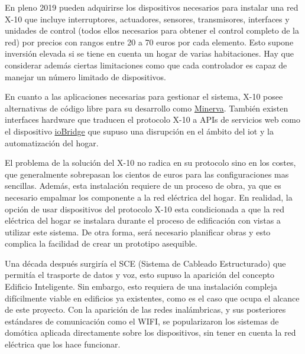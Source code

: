 \vspace{1.5cm}

En pleno 2019 pueden adquirirse los dispositivos necesarios para instalar una red X-10 que incluye interruptores, actuadores, sensores, transmisores, interfaces y unidades de control (todos ellos necesarios para obtener el control completo de la red) por precios con rangos entre 20 a 70 euros por cada elemento. Esto supone inversión elevada si se tiene en cuenta un hogar de varias habitaciones. Hay que considerar además ciertas limitaciones como que cada controlador es capaz de manejar un número limitado de dispositivos.

\vspace{1.5cm}

En cuanto a las aplicaciones necesarias para gestionar el sistema, X-10 posee alternativas de código libre para su desarrollo como \href{http://www.minervahome.net/}{Minerva}. También existen interfaces hardware que traducen el protocolo X-10 a APIs de servicios web como el dispositivo \href{http://www.iobridge.com/}{ioBridge} que supuso una disrupción en el ámbito del \gls{iot} y la automatización del hogar.

\vspace{1cm}

El problema de la solución del X-10 no radica en su protocolo sino en los costes, que generalmente sobrepasan los cientos de euros para las configuraciones mas sencillas. Además, esta instalación requiere de un proceso de obra, ya que es necesario empalmar los componente a la red eléctrica del hogar. En realidad, la opción de usar dispositivos del protocolo X-10 esta condicionada a que la red eléctrica del hogar se instalara durante el proceso de edificación con vistas a utilizar este sistema. De otra forma, será necesario planificar obras y esto complica la facilidad de crear un prototipo asequible.

\vspace{1cm}

Una década después surgiría el SCE (Sistema de Cableado Estructurado) que permitía el trasporte de datos y voz, esto supuso la aparición del concepto Edificio Inteligente. Sin embargo, esto requiera de una instalación compleja difícilmente viable en edificios ya existentes, como es el caso que ocupa el alcance de este proyecto. Con la aparición de las redes inalámbricas, y sus posteriores estándares de comunicación como el WIFI, se popularizaron los sistemas de domótica aplicada directamente sobre los dispositivos, sin tener en cuenta la red eléctrica que los hace funcionar. 

